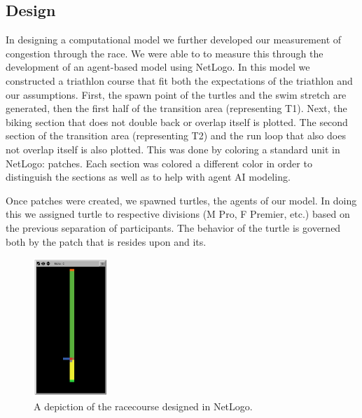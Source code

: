 \documentclass[12pt]{article}
\begin{document}
\subsection{Design}
In designing a computational model we further developed our measurement of congestion through the race. We were able to to measure this through the development of an agent-based model using NetLogo. In this model we constructed a triathlon course that fit both the expectations of the triathlon and our assumptions. First, the spawn point of the turtles and the swim stretch are generated, then the first half of the transition area (representing T1). Next, the biking section that does not double back or overlap itself is plotted. The second section of the transition area (representing T2) and the run loop that also does not overlap itself is also plotted. This was done by coloring a standard unit in NetLogo: patches. Each section was colored a different color in order to distinguish the sections as well as to help with agent AI modeling. \par

Once patches were created, we spawned turtles, the agents of our model. In doing this we assigned turtle to respective divisions (M Pro, F Premier, etc.) based on the previous separation of participants. The behavior of the turtle is governed both by the patch that is resides upon and its.

\begin{figure}[H]
\label{fig:racecourse}
  \centering
  \includegraphics[width=0.25\textwidth]{RaceCourse}
  \caption{A depiction of the racecourse designed in NetLogo.}
\end{figure}
\end{document}
